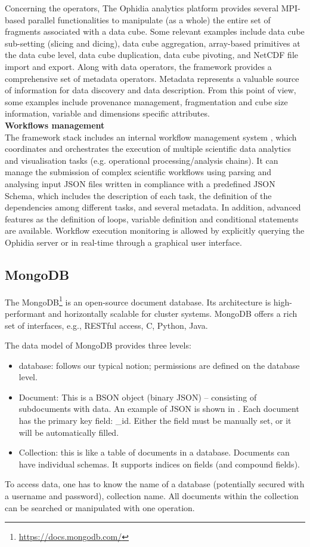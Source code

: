Concerning the operators, The Ophidia analytics platform provides several MPI-based parallel functionalities to manipulate (as a whole) the entire set of fragments associated with a data cube. Some relevant examples include data cube sub-setting (slicing and dicing), data cube aggregation, array-based primitives at the data cube level, data cube duplication, data cube pivoting, and NetCDF file import and export.
Along with data operators, the framework provides a comprehensive set of metadata operators. Metadata represents a valuable source of information for data discovery and data description. From this point of view, some examples include provenance management, fragmentation and cube size information, variable and dimensions specific attributes.\\

\textbf{Workflows management}\\

The framework stack includes an internal workflow management system \cite{DBLP:conf/ieeehpcs/PalazzoMFDEWA15}, which coordinates and orchestrates the execution of multiple scientific data analytics and visualisation tasks (e.g. operational processing/analysis chains). It can manage the submission of complex scientific workflows using parsing and analysing input JSON files written in compliance with a predefined JSON Schema, which includes the description of each task, the definition of the dependencies among different tasks, and several metadata. In addition, advanced features as the definition of loops, variable definition and conditional statements are available. Workflow execution monitoring is allowed by explicitly querying the Ophidia server or in real-time through a graphical user interface.

\subsection{MongoDB}
The MongoDB\footnote{\url{https://docs.mongodb.com/}} is an open-source document database.
Its architecture is high-performant and horizontally scalable for cluster systems.
MongoDB offers a rich set of interfaces, e.g., RESTful access, C, Python, Java.

The data model of MongoDB provides three levels:
\begin{itemize}
  \item database: follows our typical notion; permissions are defined on the database level.
  \item Document: This is a BSON object (binary JSON) -- consisting of subdocuments with data.
  An example of JSON is shown in .
  Each document has the primary key field: \_id. Either the field must be manually set, or it will be automatically filled.

  \item Collection: this is like a table of documents in a database. Documents can have individual schemas. It supports indices on fields (and compound fields).
\end{itemize}
To access data, one has to know the name of a database (potentially secured with a username and password), collection name. All documents within the collection can be searched or manipulated with one operation.

